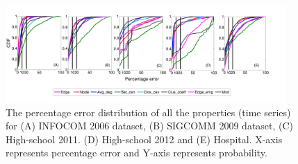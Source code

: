 %  
% 
% 
% 
% 
% 
%  
%  
 \begin{figure}
  \centering
  \includegraphics*[width=0.95\textwidth,angle=0]{./texfiles/Chapter_1/fig/error_dist_all-eps-converted-to.pdf}
 
 
 \caption{\label{fig8}  The percentage error distribution of all the properties (time series) for (A) INFOCOM 2006 dataset, (B) SIGCOMM 2009 dataset, (C) High-school 2011. (D) High-school 2012 and (E) Hospital. 
 X-axis represents percentage error and Y-axis represents 
 probability.}
\end{figure} 

\medskip
